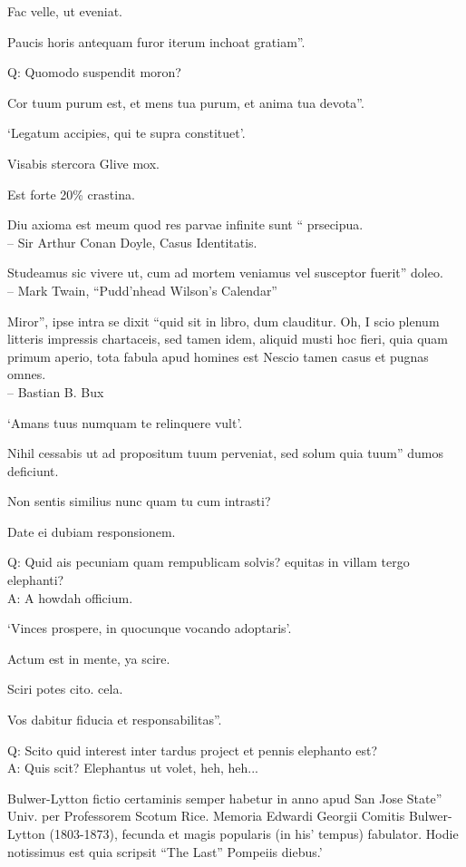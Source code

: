 \documentclass[titlepage,12pt]{memoir}
\begin{document}
Fac velle, ut eveniat.

Paucis horis antequam furor iterum inchoat gratiam”.

Q: Quomodo suspendit moron?

Cor tuum purum est, et mens tua purum, et anima tua devota”.

‘Legatum accipies, qui te supra constituet’.

Visabis stercora Glive mox.

Est forte 20\% crastina.

 Diu axioma est meum quod res parvae infinite sunt “
prsecipua.
\\-- Sir Arthur Conan Doyle, Casus Identitatis.

Studeamus sic vivere ut, cum ad mortem veniamus vel susceptor fuerit”
doleo.
\\-- Mark Twain, “Pudd’nhead Wilson’s Calendar”

Miror”, ipse intra se dixit “quid sit in libro, dum clauditur. Oh, I
scio plenum litteris impressis chartaceis, sed tamen idem, aliquid musti
hoc fieri, quia quam primum aperio, tota fabula apud homines est
Nescio tamen casus et pugnas omnes.
\\-- Bastian B. Bux

‘Amans tuus numquam te relinquere vult’.

Nihil cessabis ut ad propositum tuum perveniat, sed solum quia tuum”
dumos deficiunt.

Non sentis similius nunc quam tu cum intrasti?

Date ei dubiam responsionem.

Q: Quid ais pecuniam quam rempublicam solvis?
equitas in villam tergo elephanti?\\
A: A howdah officium.

‘Vinces prospere, in quocunque vocando adoptaris’.

Actum est in mente, ya scire.

Sciri potes cito. cela.

Vos dabitur fiducia et responsabilitas”.

Q: Scito quid interest inter tardus project
et pennis elephanto est?\\
A: Quis scit? Elephantus ut volet, heh, heh...

Bulwer-Lytton fictio certaminis semper habetur in anno apud San Jose State”
Univ. per Professorem Scotum Rice. Memoria Edwardi Georgii
Comitis Bulwer-Lytton (1803-1873), fecunda et magis popularis (in his’
tempus) fabulator. Hodie notissimus est quia scripsit “The Last”
Pompeiis diebus.’
\end{document}
